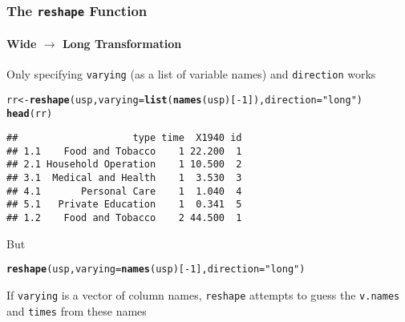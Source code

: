 \documentclass[paper=screen,mathserif]{beamer}\usepackage[]{graphicx}\usepackage[]{color}
\makeatletter
\newcommand{\hlnum}[1]{\textcolor[rgb]{0.686,0.059,0.569}{#1}}%
\newcommand{\hlstr}[1]{\textcolor[rgb]{0.192,0.494,0.8}{#1}}%
\newcommand{\hlopt}[1]{\textcolor[rgb]{0,0,0}{#1}}%
\newcommand{\hlstd}[1]{\textcolor[rgb]{0.345,0.345,0.345}{#1}}%
\newcommand{\hlkwb}[1]{\textcolor[rgb]{0.69,0.353,0.396}{#1}}%
\newcommand{\hlkwc}[1]{\textcolor[rgb]{0.333,0.667,0.333}{#1}}%
\newcommand{\hlkwd}[1]{\textcolor[rgb]{0.737,0.353,0.396}{\textbf{#1}}}%
\newenvironment{kframe}{%
 \def\at@end@of@kframe{}%
 \ifinner\ifhmode%
  \def\at@end@of@kframe{\end{minipage}}%
  \begin{minipage}{\columnwidth}%
 \fi\fi%
 \def\FrameCommand##1{\hskip\@totalleftmargin \hskip-\fboxsep
 \colorbox{shadecolor}{##1}\hskip-\fboxsep
     \hskip-\linewidth \hskip-\@totalleftmargin \hskip\columnwidth}%
 \MakeFramed {\advance\hsize-\width
   \@totalleftmargin\z@ \linewidth\hsize
   \@setminipage}}%
 {\par\unskip\endMakeFramed%
 \at@end@of@kframe}
\newenvironment{knitrout}{}{} %
\newcommand{\ft}[1]{\frametitle{#1}}
\newcommand{\fst}[1]{\framesubtitle{#1}}
\makeatother
\begin{document}
\begin{frame}[fragile]
  \ft{The {\tt reshape} Function}
  \fst{Wide $\rightarrow$ Long Transformation}
  
  {\small Only specifying \verb=varying= (as a list of variable names) and
  \verb=direction= works}
\begin{knitrout}\tiny
{}\color{fgcolor}\begin{kframe}
\begin{alltt}
\hlstd{rr} \hlkwb{<-} \hlkwd{reshape}\hlstd{(usp,} \hlkwc{varying} \hlstd{=} \hlkwd{list}\hlstd{(}\hlkwd{names}\hlstd{(usp)[}\hlopt{-}\hlnum{1}\hlstd{]),} \hlkwc{direction} \hlstd{=} \hlstr{"long"}\hlstd{)}
\hlkwd{head}\hlstd{(rr)}
\end{alltt}
\begin{verbatim}
##                    type time  X1940 id
## 1.1    Food and Tobacco    1 22.200  1
## 2.1 Household Operation    1 10.500  2
## 3.1  Medical and Health    1  3.530  3
## 4.1       Personal Care    1  1.040  4
## 5.1   Private Education    1  0.341  5
## 1.2    Food and Tobacco    2 44.500  1
\end{verbatim}
\end{kframe}
\end{knitrout}
{\small But}
\begin{knitrout}\scriptsize
{}\color{fgcolor}\begin{kframe}
\begin{alltt}
\hlkwd{reshape}\hlstd{(usp,} \hlkwc{varying} \hlstd{=} \hlkwd{names}\hlstd{(usp)[}\hlopt{-}\hlnum{1}\hlstd{],} \hlkwc{direction} \hlstd{=} \hlstr{"long"}\hlstd{)}
\end{alltt}


{\ttfamily\noindent\bfseries\color{errorcolor}{\#\# Error in guess(varying): failed to guess time-varying variables from their names}}\end{kframe}
\end{knitrout}
{\small If \verb=varying= is a vector of column names, \verb=reshape=
  attempts to guess the \verb=v.names= and \verb=times= from these names}


\end{frame}
\end{document}
